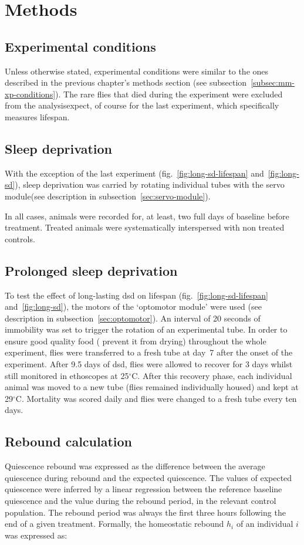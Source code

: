 \section{Methods}
\label{subsec:sd-matmet}
\subsection{Experimental conditions}
Unless otherwise stated, experimental conditions were similar to the ones described in the previous chapter's methods section (see subsection~\ref{subsec:mm-xp-conditions}).
The rare flies that died during the experiment were excluded from the analysis\emd{}expect, of course for the last experiment, which specifically measures lifespan.


\subsection{Sleep deprivation}
With the exception of the
last experiment (fig.~\ref{fig:long-sd-lifespan} and~\ref{fig:long-sd}),
sleep deprivation was carried by rotating individual tubes with the servo module(see description in subsection~\ref{sec:servo-module}).
																											 
In all cases, animals were recorded for, at least, two full days of baseline before treatment.
Treated animals were systematically interspersed with non treated controls.

\subsection{Prolonged sleep deprivation}
To test the effect of long-lasting \gls{dsd} on lifespan (fig.~\ref{fig:long-sd-lifespan} and~\ref{fig:long-sd}), the motors of the `optomotor module' were used (see description in subsection~\ref{sec:optomotor}).
An interval of 20 seconds of immobility was set to trigger the rotation of an experimental tube.
In order to ensure good quality food (\eg{} prevent it from drying) throughout the whole experiment, flies were transferred to a fresh tube at day~7 after the onset of the experiment.
After 9.5 days of \gls{dsd}, flies were allowed to recover for 3 days whilst still monitored in ethoscopes at 25$^{\circ}$C.
After this recovery phase, each individual animal was moved to a new tube (flies remained individually housed) and kept at 29$^{\circ}$C.
Mortality was scored daily and flies were changed to a fresh tube every ten days.

\subsection{Rebound calculation}
\label{subsec:mm-rebound}
Quiescence rebound was expressed as the difference between the average quiescence during rebound and the expected quiescence.
The values of expected quiescence were inferred by a linear regression between 
the reference baseline quiescence and the value during the rebound period,
in the relevant control population.
The rebound period was always the first three hours following the end of a given treatment.
Formally, the homeostatic rebound $h_i$ of an individual $i$ was expressed as:

